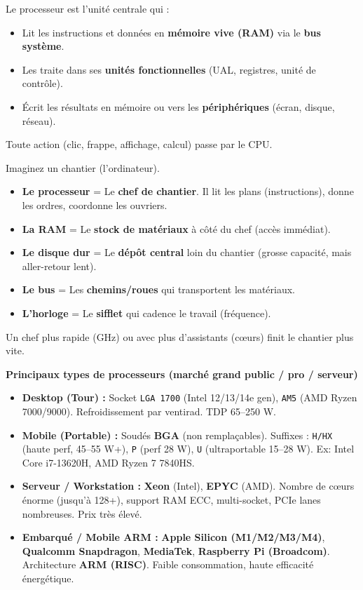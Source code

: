 \documentclass[11pt]{article}
\begin{document}
\begin{propriete}
Le processeur est l'unité centrale qui :
\begin{itemize}
    \item Lit les instructions et données en \textbf{mémoire vive (RAM)} via le \textbf{bus système}.
    \item Les traite dans ses \textbf{unités fonctionnelles} (UAL, registres, unité de contrôle).
    \item Écrit les résultats en mémoire ou vers les \textbf{périphériques} (écran, disque, réseau).
\end{itemize}
Toute action (clic, frappe, affichage, calcul) passe par le CPU.
\end{propriete}

\begin{exemplebox}
Imaginez un chantier (l'ordinateur).
\begin{itemize}
    \item \textbf{Le processeur} = Le \textbf{chef de chantier}. Il lit les plans (instructions), donne les ordres, coordonne les ouvriers.
    \item \textbf{La RAM} = Le \textbf{stock de matériaux} à côté du chef (accès immédiat).
    \item \textbf{Le disque dur} = Le \textbf{dépôt central} loin du chantier (grosse capacité, mais aller-retour lent).
    \item \textbf{Le bus} = Les \textbf{chemins/roues} qui transportent les matériaux.
    \item \textbf{L'horloge} = Le \textbf{sifflet} qui cadence le travail (fréquence).
\end{itemize}
Un chef plus rapide (GHz) ou avec plus d'assistants (cœurs) finit le chantier plus vite.
\end{exemplebox}

\textbf{Principaux types de processeurs (marché grand public / pro / serveur)}\par
\begin{itemize}
    \item \textbf{Desktop (Tour) :} Socket \texttt{LGA 1700} (Intel 12/13/14e gen), \texttt{AM5} (AMD Ryzen 7000/9000). Refroidissement par ventirad. TDP 65--250 W.
    \item \textbf{Mobile (Portable) :} Soudés \textbf{BGA} (non remplaçables). Suffixes : \texttt{H/HX} (haute perf, 45--55 W+), \texttt{P} (perf 28 W), \texttt{U} (ultraportable 15--28 W). Ex: Intel Core i7-13620H, AMD Ryzen 7 7840HS.
    \item \textbf{Serveur / Workstation :} \textbf{Xeon} (Intel), \textbf{EPYC} (AMD). Nombre de cœurs énorme (jusqu'à 128+), support RAM ECC, multi-socket, PCIe lanes nombreuses. Prix très élevé.
    \item \textbf{Embarqué / Mobile ARM :} \textbf{Apple Silicon (M1/M2/M3/M4)}, \textbf{Qualcomm Snapdragon}, \textbf{MediaTek}, \textbf{Raspberry Pi (Broadcom)}. Architecture \textbf{ARM (RISC)}. Faible consommation, haute efficacité énergétique.
\end{itemize}
\end{document}

